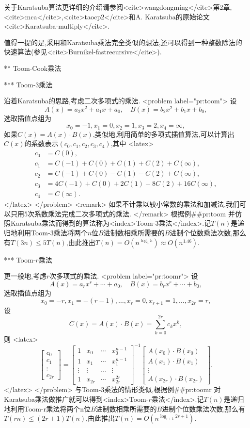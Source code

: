 关于Karatsuba算法更详细的介绍请参阅<cite>wangdongming</cite>第2章,<cite>mca</cite>,<cite>taocp2</cite>和A. Karatsuba的原始论文<cite>Karatsuba-multiply</cite>.

值得一提的是,采用和Karatsuba乘法完全类似的想法,还可以得到一种整数除法的快速算法(参见<cite>Burnikel-fastrecursive</cite>).

** Toom-Cook乘法

*** Toom-3乘法

沿着Karatsuba的思路,考虑二次多项式的乘法.
<problem label="pr:toom">
设$$A(x)=a_2x^2+a_1x+a_0,\quad B(x)=b_2x^2+b_1x+b_0,$$选取插值点组为$$x_0=-1,x_1=0,x_2=1,x_3=2,x_4=\infty,$$如果$C(x)=A(x)\cdot B(x)$,类似地,利用简单的多项式插值算法,可以计算出$C(x) $的系数表示$(c_0,c_1,c_2,c_3,c_4)$,其中
<latex>
\begin{align*}
c_0&=C(0),\\
c_1&=C(-1)+C(0)+C(1)+C(2)+C(\infty),\\
c_2&=C(-1)+C(0)-C(1)-C(2)+C(\infty),\\
c_3&=4C(-1)+C(0)+2C(1)+8C(2)+16C(\infty),\\
c_4&=C(\infty).
\end{align*}
</latex>
</problem>
<remark>
如果不计乘以较小常数的乘法和加减法,我们可以只用5次系数乘法完成二次多项式的乘法.
</remark>
根据例##pr:toom 并仿照Karatsuba乘法而得到的算法称为<index>Toom-3乘法</index>.记$T(n)$是递归地利用Toom-3乘法将两个$n$位$B$进制数相乘所需要的$B$进制个位数乘法次数,那么有$T(3n)\le 5T(n)$,由此推出$T(n)=O(n^{\log_3{5}})\approx O(n^{1.46})$.

*** Toom-$r$乘法

更一般地,考虑$r$次多项式的乘法.
<problem label="pr:toomr">
设$$A(x)=a_rx^r+\cdots+a_0,\quad B(x)=b_rx^r+\cdots+b_0,$$选取插值点组为$$x_0=-r,x_1=-(r-1),\ldots,x_r=0,x_{r+1}=1,\ldots,x_{2r}=r,$$设$$C(x)=A(x)\cdot B(x)=\sum_{k=0}^{2r}c_kx^k,$$则
<latex>
\begin{equation*}
  \begin{bmatrix}
    c_0\\
    c_1\\
    \vdots\\
    c_{2r}
  \end{bmatrix}
=
  \begin{bmatrix}
    1 & x_0 & \cdots & x_0^{n-1}\\
    1 & x_1 & \cdots & x_1^{n-1}\\
    \vdots & \vdots & \ldots & \vdots\\
    1 & x_{2r} & \cdots & x_{2r}^{2r}
  \end{bmatrix}
^{-1}
  \begin{bmatrix}
    A(x_0)\cdot B(x_0)\\
    A(x_1)\cdot B(x_1)\\
    \vdots\\
    A(x_{2r})\cdot B(x_{2r})
  \end{bmatrix}.
\end{equation*}
</latex>
</problem>
与Toom-3乘法的情形类似,根据例##pr:toomr 对Karatsuba乘法做推广就可以得到<index>Toom-$r$乘法</index>.记$T(n)$是递归地利用Toom-r乘法将两个n位$B$进制数相乘所需要的$B$进制个位数乘法次数,那么有$T(rn)\le (2r+1)T(n)$,由此推出$T(n)=O(n^{\log_{r+1}{2r+1}})$.

